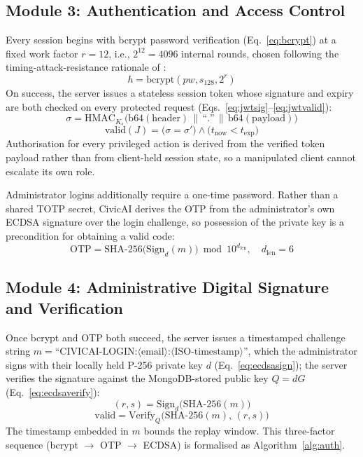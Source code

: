 \documentclass[conference]{IEEEtran}
\begin{document}
\subsection{Module 3: Authentication and Access Control}
Every session begins with bcrypt password verification (Eq.~\ref{eq:bcrypt}) at a fixed work factor $r=12$, i.e., $2^{12}=4096$ internal rounds, chosen following the timing-attack-resistance rationale of \cite{provos1999bcrypt}:
\begin{equation}
h = \mathrm{bcrypt}(pw, s_{128}, 2^{r})
\label{eq:bcrypt}
\end{equation}
On success, the server issues a stateless session token whose signature and expiry are both checked on every protected request (Eqs.~\ref{eq:jwtsig}--\ref{eq:jwtvalid}):
\begin{equation}
\sigma = \mathrm{HMAC}_{K_s}\big(\mathrm{b64}(\mathrm{header}) \,\|\, \text{``.''} \,\|\, \mathrm{b64}(\mathrm{payload})\big)
\label{eq:jwtsig}
\end{equation}
\begin{equation}
\mathrm{valid}(J) = \big(\sigma = \sigma'\big) \wedge \big(t_{\mathrm{now}} < t_{\mathrm{exp}}\big)
\label{eq:jwtvalid}
\end{equation}
Authorisation for every privileged action is derived from the verified token payload rather than from client-held session state, so a manipulated client cannot escalate its own role.

Administrator logins additionally require a one-time password. Rather than a shared TOTP secret, CivicAI derives the OTP from the administrator's own ECDSA signature over the login challenge, so possession of the private key is a precondition for obtaining a valid code:
\begin{equation}
\mathrm{OTP} = \mathrm{SHA\text{-}256}\big(\mathrm{Sign}_d(m)\big) \bmod 10^{d_{\mathrm{len}}}, \quad d_{\mathrm{len}} = 6
\label{eq:totp}
\end{equation}

\subsection{Module 4: Administrative Digital Signature and Verification}
Once bcrypt and OTP both succeed, the server issues a timestamped challenge string $m = \text{``CIVICAI-LOGIN:}\langle\text{email}\rangle\text{:}\langle\text{ISO-timestamp}\rangle\text{''}$, which the administrator signs with their locally held P-256 private key $d$ (Eq.~\ref{eq:ecdsasign}); the server verifies the signature against the MongoDB-stored public key $Q = dG$ (Eq.~\ref{eq:ecdsaverify}):
\begin{equation}
(r,s) = \mathrm{Sign}_{d}\big(\mathrm{SHA\text{-}256}(m)\big)
\label{eq:ecdsasign}
\end{equation}
\begin{equation}
\mathrm{valid} = \mathrm{Verify}_{Q}\big(\mathrm{SHA\text{-}256}(m),\,(r,s)\big)
\label{eq:ecdsaverify}
\end{equation}
The timestamp embedded in $m$ bounds the replay window. This three-factor sequence (bcrypt $\rightarrow$ OTP $\rightarrow$ ECDSA) is formalised as Algorithm~\ref{alg:auth}.
\end{document}
